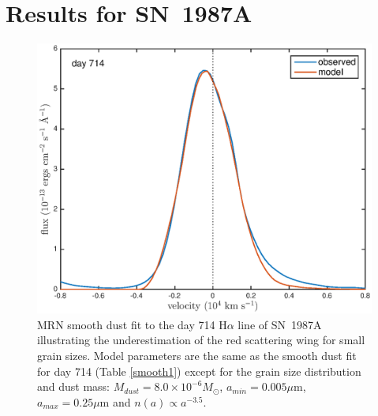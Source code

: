 \documentclass[useAMS,usenatbib,usegraphicx]{mnras}
\begin{document}



\section{Results for SN~1987A}
\label{results}

\begin{figure}
\begin{center}
\includegraphics[trim =33 10 45 15,clip=true,scale=0.51]{smooth/d714Ha_smooth_amC_MRN}
\caption{MRN smooth dust fit to the day 714 H$\alpha$ line of SN~1987A illustrating the 
underestimation of the red scattering wing for small grain sizes.  Model 
parameters are the same as the smooth dust fit for day 714 (Table \ref{smooth1}) except for the 
grain size distribution and dust mass:  $M_{dust}=8.0 \times 10^{-6} 
M_{\odot}$, $a_{min}=0.005 \mu$m, $a_{max}=0.25 \mu$m and $n(a) \propto 
a^{-3.5}$.}
\label{MRN}
\end{center}
\end{figure}
\end{document}
